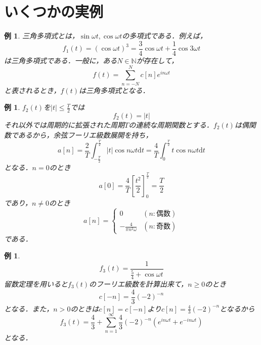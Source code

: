 \documentclass[a4j]{jsbook}
\newtheorem{example}[theorem]{例}
\numberwithin{theorem}{chapter}  %
\begin{document}
\section{いくつかの実例} \label{sec1-4}
\begin{example} 
\label{ex1-1}
三角多項式とは，\(\sin\omega t, \cos\omega t\)の多項式である．例えば，
\begin{equation*}
    f_1(t)=(\cos\omega t)^3=\frac{3}{4}\cos\omega t+\frac{1}{4}\cos 3\omega t
\end{equation*}
は三角多項式である．一般に，ある\(N\in\mathbb{N}\)が存在して，
\begin{equation*}
    f(t)=\sum_{n=-N}^N c[n]e^{in\omega t}
\end{equation*}
と表されるとき，\(f(t)\)は三角多項式となる．
\end{example}
\begin{example} 
\label{ex1-2}
\(f_2(t)\)を\(\displaystyle |t|\leq\frac{T}{2}\)では
\begin{equation*}
    f_2(t)=|t|
\end{equation*}
それ以外では周期的に拡張された周期\(T\)の連続な周期関数とする．\(f_2(t)\)は偶関数であるから，余弦フーリエ級数展開を持ち，
\begin{equation*}
    a[n]=\frac{2}{T}\int_{-\frac{T}{2}}^{\frac{T}{2}}|t|\cos n\omega t\mathrm{d}t=\frac{4}{T}\int_0^{\frac{T}{2}} t\cos n\omega t\mathrm{d}t
\end{equation*}
となる．\(n=0\)のとき
\begin{equation*}
    a[0]=\frac{4}{T}\left[\frac{t^2}{2}\right]_0^{\frac{T}{2}}=\frac{T}{2}
\end{equation*}
であり，\(n\neq 0\)のとき
\begin{equation*}
    a[n]= \begin{cases}
    0 & (n: \mbox{偶数}) \\
    -\frac{4}{\pi n^2\omega} & (n: \mbox{奇数})
    \end{cases}
\end{equation*}
である．
\end{example}
\begin{example}
\label{ex1-3}
\begin{equation*}
    f_3(t)=\frac{1}{\frac{5}{4}+\cos\omega t}
\end{equation*}
留数定理を用いると\(f_3(t)\)のフーリエ級数を計算出来て，\(n\geq 0\)のとき
\begin{equation*}
    c[-n]=\frac{4}{3}(-2)^{-n}
\end{equation*}
となる．また，\(n>0\)のときは\(c[n]=c[-n]\)より\(\displaystyle c[n]=\frac{4}{3}(-2)^{-n}\)となるから
\begin{equation*}
    f_3(t)=\frac{4}{3}+\sum_{n=1}^\infty \frac{4}{3}(-2)^{-n}\left(e^{in\omega t}+e^{-in\omega t}\right)
\end{equation*}
となる．
\end{example}
\end{document}
